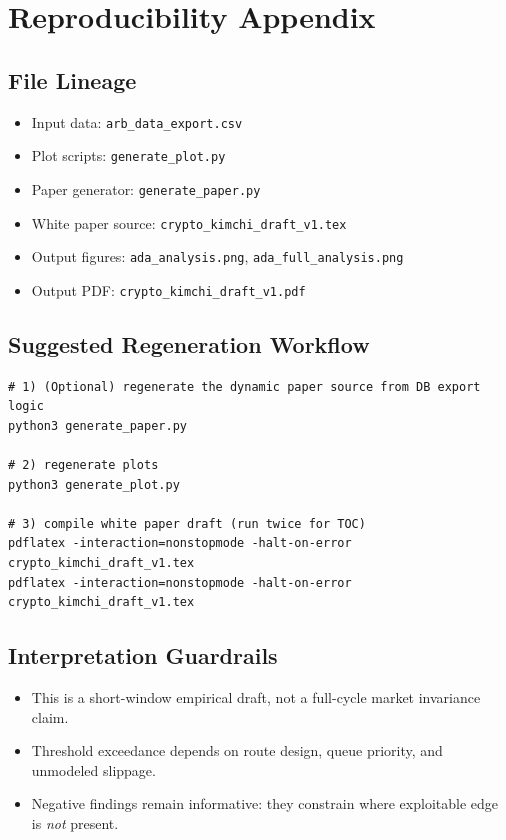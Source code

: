 \documentclass[11pt,a4paper]{article}
\begin{document}
\appendix
\section{Reproducibility Appendix}
\subsection{File Lineage}
\begin{itemize}
    \item Input data: \texttt{arb\_data\_export.csv}
    \item Plot scripts: \texttt{generate\_plot.py}
    \item Paper generator: \texttt{generate\_paper.py}
    \item White paper source: \texttt{crypto\_kimchi\_draft\_v1.tex}
    \item Output figures: \texttt{ada\_analysis.png}, \texttt{ada\_full\_analysis.png}
    \item Output PDF: \texttt{crypto\_kimchi\_draft\_v1.pdf}
\end{itemize}

\subsection{Suggested Regeneration Workflow}
\begin{verbatim}
# 1) (Optional) regenerate the dynamic paper source from DB export logic
python3 generate_paper.py

# 2) regenerate plots
python3 generate_plot.py

# 3) compile white paper draft (run twice for TOC)
pdflatex -interaction=nonstopmode -halt-on-error crypto_kimchi_draft_v1.tex
pdflatex -interaction=nonstopmode -halt-on-error crypto_kimchi_draft_v1.tex
\end{verbatim}

\subsection{Interpretation Guardrails}
\begin{itemize}
    \item This is a short-window empirical draft, not a full-cycle market invariance claim.
    \item Threshold exceedance depends on route design, queue priority, and unmodeled slippage.
    \item Negative findings remain informative: they constrain where exploitable edge is \emph{not} present.
\end{itemize}
\end{document}
